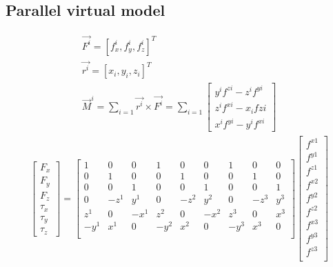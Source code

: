 \documentclass[]{article}
\begin{document}
\subsection{Parallel virtual model} 
\begin{eqnarray}
\vec{F^i}=[f^i_x,f^i_y,f^i_z]^T	\\
\vec{r^i}=[x_i,y_i,z_i]^T	\\
\vec{M}^i=\sum_{i=1}\vec{r^i}\times\vec{F^i}=\sum_{i=1}
\begin{bmatrix}
y^if^{zi}-z^if^{yi}	\\
z^if^{xi}-x_if{zi}	\\
x^if^{yi}-y^if^{xi}
\end{bmatrix}
\end{eqnarray}
\begin{eqnarray}
\begin{bmatrix}	\label{eq:equilibriumThreeLegs}
F_x	\\
F_y	\\
F_z	\\
\tau_x	\\
\tau_y	\\
\tau_z
\end{bmatrix}
=
\begin{bmatrix}
1		&0		&0		&1		&0		&0		&1		&0		&0	\\
0		&1		&0		&0		&1		&0		&0		&1		&0	\\
0		&0		&1		&0		&0		&1		&0		&0		&1	\\
0		&-z^1	&y^1	&0		&-z^2	&y^2	&0		&-z^3	&y^3\\
z^1		&0		&-x^1	&z^2	&0		&-x^2	&z^3	&0		&x^3\\
-y^1		&x^1	&0		&-y^2	&x^2	&0		&-y^3	&x^3		&0	\\
\end{bmatrix}
\begin{bmatrix}
f^{x1}	\\
f^{y1}	\\
f^{z1}	\\
f^{x2}	\\
f^{y2}	\\
f^{z2}	\\
f^{x3}	\\
f^{y3}	\\
f^{z3}	\\
\end{bmatrix}
\end{eqnarray}
\end{document}
